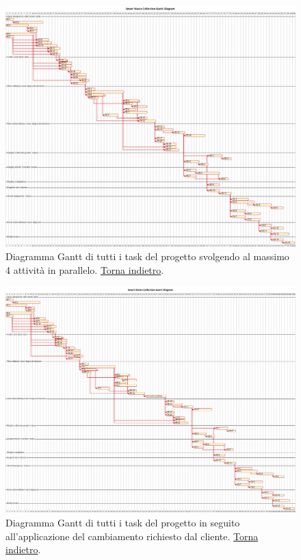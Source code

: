\begin{figure}[H]
    \centering
    \includegraphics[width=\textwidth]{../img/gantt.pm}
    \caption{Diagramma Gantt di tutti i task del progetto svolgendo al massimo 4 attività in parallelo.  \hyperlink{back:gantt}{Torna indietro}.}
    \label{fig:gantt}
\end{figure}

\begin{figure}[H]
    \centering
    \includegraphics[width=\textwidth]{../img/gantt-redefinition.pm}
    \caption{Diagramma Gantt di tutti i task del progetto in seguito all'applicazione del cambiamento richiesto dal cliente.  \hyperlink{back:gantt-redefinition}{Torna indietro}.}
    \label{fig:gantt-redefinition}
\end{figure}
